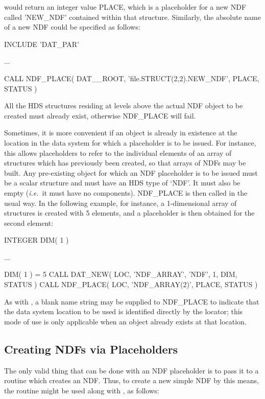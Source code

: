 \documentclass[twoside,11pt,nolof]{starlink}
\providecommand{\st}[1]{{\emph{#1}}}
\begin{document}
would return an integer value PLACE, which is a placeholder for a new
NDF called 'NEW\_NDF' contained within that structure. Similarly,
the absolute name of a new NDF could be specified as follows:

\small
\begin{terminalv}
      INCLUDE 'DAT_PAR'

      ...

      CALL NDF_PLACE( DAT__ROOT, 'file.STRUCT(2,2).NEW_NDF', PLACE, STATUS )
\end{terminalv}
\normalsize

All the HDS structures residing at levels above the actual NDF object
to be created must already exist, otherwise NDF\_PLACE will fail.

Sometimes, it is more convenient if an object is already in existence
at the location in the data system for which a placeholder is to be
issued.
For instance, this allows placeholders to refer to the individual
elements of an array of structures which has previously been created,
so that arrays of NDFs may be built.
Any pre-existing object for which an NDF placeholder is to be issued
must be a scalar structure and must have an HDS type of `NDF'.
It must also be empty (\st{i.e.}\ it must have no components).
NDF\_PLACE is then called in the usual way.
In the following example, for instance, a 1-dimensional array of
structures is created with 5 elements, and a placeholder is then
obtained for the second element:

\small
\begin{terminalv}
      INTEGER DIM( 1 )

      ...

      DIM( 1 ) = 5
      CALL DAT_NEW( LOC, 'NDF_ARRAY', 'NDF', 1, DIM, STATUS )
      CALL NDF_PLACE( LOC, 'NDF_ARRAY(2)', PLACE, STATUS )
\end{terminalv}
\normalsize

As with , a blank name string may be supplied to NDF\_PLACE
to indicate that the data system location to be used is identified
directly by the locator; this mode of use is only applicable when an
object already exists at that location.

\subsection{Creating NDFs via Placeholders}

The only valid thing that can be done with an NDF placeholder is to pass it
to a routine which creates an NDF.
Thus, to create a new simple NDF by this means, the routine  might
be used along with , as follows:
\end{document}
